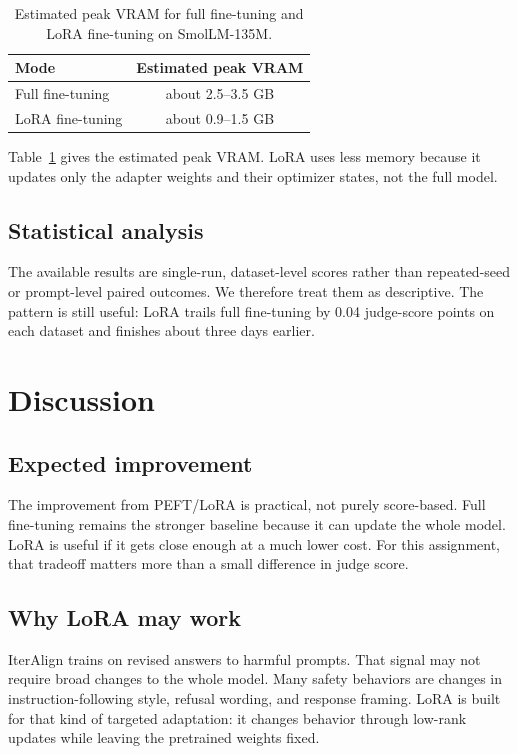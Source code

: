 \documentclass[11pt]{article}
\begin{document}
\begin{table}[H]
\centering
\caption{Estimated peak VRAM for full fine-tuning and LoRA fine-tuning on SmolLM-135M.}
\label{tab:vram-comparison}
\begin{tabular}{lc}
\toprule
Mode & Estimated peak VRAM \\
\midrule
Full fine-tuning & about 2.5--3.5 GB \\
LoRA fine-tuning & about 0.9--1.5 GB \\
\bottomrule
\end{tabular}
\end{table}

Table~\ref{tab:vram-comparison} gives the estimated peak VRAM. LoRA uses less memory because it updates only the adapter weights and their optimizer states, not the full model.

\subsection{Statistical analysis}
The available results are single-run, dataset-level scores rather than repeated-seed or prompt-level paired outcomes. We therefore treat them as descriptive. The pattern is still useful: LoRA trails full fine-tuning by 0.04 judge-score points on each dataset and finishes about three days earlier.

\section{Discussion}
\label{sec:discussion}

\subsection{Expected improvement}
The improvement from PEFT/LoRA is practical, not purely score-based. Full fine-tuning remains the stronger baseline because it can update the whole model. LoRA is useful if it gets close enough at a much lower cost. For this assignment, that tradeoff matters more than a small difference in judge score.

\subsection{Why LoRA may work}
IterAlign trains on revised answers to harmful prompts. That signal may not require broad changes to the whole model. Many safety behaviors are changes in instruction-following style, refusal wording, and response framing. LoRA is built for that kind of targeted adaptation: it changes behavior through low-rank updates while leaving the pretrained weights fixed.
\end{document}
